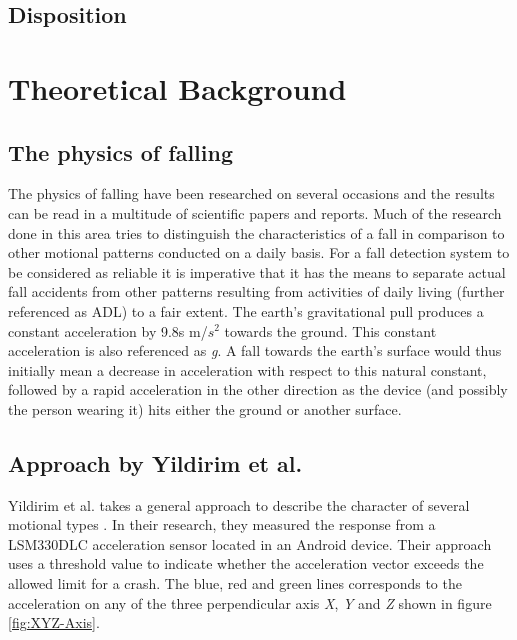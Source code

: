 \documentclass[12pt, a4paper, onecolumn]{article}
\begin{document}
		\subsection{Disposition}
		
	\newpage
	
	\section{Theoretical Background}
	
	\subsection{The physics of falling}
	The physics of falling have been researched on several occasions and the results can be read in a multitude of scientific papers and reports. Much of the research done in this area tries to distinguish the characteristics of a fall in comparison to other motional patterns conducted on a daily basis. For a fall detection system to be considered as reliable it is imperative that it has the means to separate actual fall accidents from other patterns resulting from activities of daily living (further referenced as ADL) to a fair extent. The earth's gravitational pull produces a constant acceleration by 9.8s m/$s^{2}$ towards the ground. This constant acceleration is also referenced as \textit{g}. A fall towards the earth's surface would thus initially mean a decrease in acceleration with respect to this natural constant, followed by a rapid acceleration in the other direction as the device (and possibly the person wearing it) hits either the ground or another surface.
	
	\subsection{Approach by Yildirim et al.}
	Yildirim et al. takes a general approach to describe the character of several motional types \cite{int_journ}. In their research, they measured the response from a LSM330DLC acceleration sensor located in an Android device. Their approach uses a threshold value to indicate whether the acceleration vector exceeds the allowed limit for a crash. The blue, red and green lines corresponds to the acceleration on any of the three perpendicular axis \textit{X}, \textit{Y} and \textit{Z} shown in figure \ref{fig:XYZ-Axis}.
	
\end{document}

